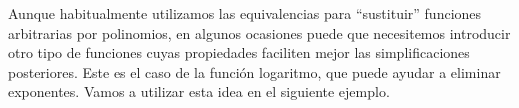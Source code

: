 %
%

Aunque habitualmente utilizamos las equivalencias para ``sustituir'' funciones arbitrarias por polinomios, en algunos ocasiones puede que necesitemos introducir otro tipo de funciones cuyas propiedades faciliten mejor las simplificaciones posteriores.
Este es el caso de la función logaritmo, que puede ayudar a eliminar exponentes.
Vamos a utilizar esta idea en el siguiente ejemplo.

